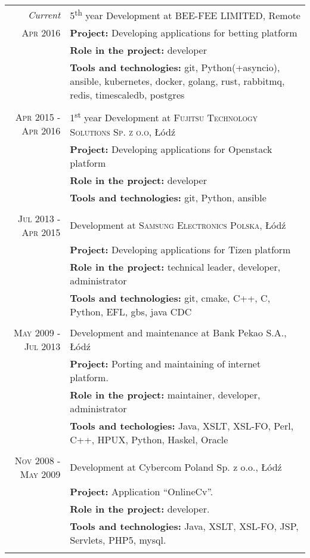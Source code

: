 \documentclass[a4paper,9pt]{article} %
\begin{document}
\begin{longtable}{r|p{11cm}}
\emph{Current} & 5\textsuperscript{th} year Development at \textsc{BEE-FEE LIMITED}, Remote \\
\textsc{Apr 2016} & \textbf{Project:} Developing applications for betting platform\\
& \textbf{Role in the project:} developer\\
& \textbf{Tools and technologies:} git, Python(+asyncio), ansible, kubernetes, docker,
golang, rust, rabbitmq, redis, timescaledb, postgres\\
\multicolumn{2}{c}{} \\

\textsc{Apr 2015 - Apr 2016} & 1\textsuperscript{st} year Development at \textsc{Fujitsu Technology Solutions Sp. z o.o}, Łódź \\
& \textbf{Project:} Developing applications for Openstack platform\\
& \textbf{Role in the project:} developer\\
& \textbf{Tools and technologies:} git, Python, ansible\\
\multicolumn{2}{c}{} \\

\textsc{Jul 2013 - Apr 2015} & Development at \textsc{Samsung Electronics Polska}, Łódź \\
& \textbf{Project:} Developing applications for Tizen platform\\
& \textbf{Role in the project:} technical leader, developer, administrator\\
& \textbf{Tools and technologies:} git, cmake, C++, C, Python, EFL, gbs, java CDC\\
\multicolumn{2}{c}{} \\

\textsc{May 2009 - Jul 2013} & Development and maintenance at Bank Pekao S.A., Łódź\\
& \textbf{Project:} Porting and maintaining of internet platform.\\
& \textbf{Role in the project:} maintainer, developer, administrator\\
& \textbf{Tools and techologies:} Java, XSLT, XSL-FO, Perl, C++, HPUX, Python, Haskel, Oracle\\
\multicolumn{2}{c}{} \\

\textsc{Nov 2008 - May 2009} & Development at Cybercom Poland Sp. z o.o., Łódź\\
& \textbf{Project:} Application “OnlineCv”.\\
& \textbf{Role in the project:} developer.\\
& \textbf{Tools and technologies:} Java, XSLT, XSL-FO, JSP, Servlets, PHP5, mysql.\\
\multicolumn{2}{c}{} \\


\end{longtable}
\end{document}
